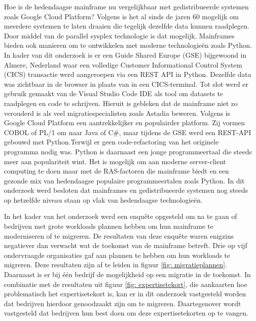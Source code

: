 Hoe is de hedendaagse mainframe nu vergelijkbaar met gedistribueerde systemen zoals Google Cloud Platform? Volgens \textcite{Sarkar2020} is het al sinds de jaren 60 mogelijk om meerdere systemen te laten draaien die tegelijk dezelfde data kunnen raadplegen. Door middel van de parallel sysplex technologie is dat mogelijk. Mainframes bieden ook manieren om te ontwikkelen met moderne technologieën zoals Python. In kader van dit onderzoek is er een Guide Shared Europe (GSE) bijgewoond in Almere, Nederland waar een volledige Customer Informational Control System (CICS) transactie werd aangeroepen via een REST API in Python. Dezelfde data was zichtbaar in de browser in plaats van in een CICS-terminal. Tot slot werd er gebruik gemaakt van de Visual Studio Code IDE als tool om datasets te raadplegen en code te schrijven. Hieruit is gebleken dat de mainframe niet zo verouderd is als veel migratiespecialisten zoals Astadia beweren. Volgens \textcite{Astadia2021} is Google Cloud Platform een aantrekkelijker en populairder platform. Zij vormen COBOL of PL/1  om naar Java of C\#, maar tijdens de GSE werd een REST-API gebouwd met Python.Terwijl er geen code-refactoring van het originele programma nodig was. Python is daarnaast een jonge programmeertaal die steeds meer aan populariteit wint.  Het is mogelijk om aan moderne server-client computing te doen maar met de RAS-factoren die mainframe biedt en een gezonde mix van hedendaagse populaire programmeertalen zoals Python. In dit onderzoek werd besloten dat mainframes en gedistribueerde systemen nog steeds op hetzelfde niveau staan op vlak van hedendaagse technologieën. 

In het kader van het onderzoek werd een enquête opgesteld om na te gaan of bedrijven met grote workloads plannen hebben om hun mainframe te moderniseren of te migreren. De resultaten van deze enquête waren enigzins negatiever dan verwacht wat de toekomst van de mainframe betreft. Drie op vijf ondervraagde organisaties gaf aan plannen te hebben om hun workloads te migreren. Deze resultaten zijn af te leiden in figuur \ref{fig: migratieplannen}. Daarnaast is er bij één bedrijf de mogelijkheid op een migratie in de toekomst. In combinatie met de resultaten uit figuur \ref{fig: expertisetekort}, die aankaarten hoe problematisch het expertisetekort is, kan er in dit onderzoek vastgesteld worden dat bedrijven hierdoor genoodzaakt zijn om te migreren. Daartegenover wordt vastgesteld dat bedrijven hun best doen om deze expertisetekorten op te vangen. 

